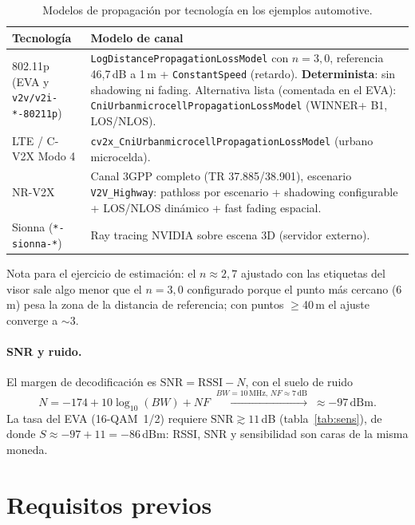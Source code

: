 \documentclass[11pt,a4paper]{article}
\begin{document}
\begin{table}[h!]
\centering\small
\begin{tabular}{@{}p{}p{}@{}}
\toprule
\textbf{Tecnología} & \textbf{Modelo de canal} \\
\midrule
802.11p (EVA y \texttt{v2v/v2i-*-80211p}) & \texttt{LogDistancePropagationLossModel} con $n=3{,}0$, referencia 46,7\,dB a 1\,m + \texttt{ConstantSpeed} (retardo). \textbf{Determinista}: sin shadowing ni fading. Alternativa lista (comentada en el EVA): \texttt{CniUrbanmicrocellPropagationLossModel} (WINNER+ B1, LOS/NLOS). \\
LTE / C-V2X Modo 4 & \texttt{cv2x\_CniUrbanmicrocellPropagationLossModel} (urbano microcelda). \\
NR-V2X & Canal 3GPP completo (TR 37.885/38.901), escenario \texttt{V2V\_Highway}: pathloss por escenario + shadowing configurable + LOS/NLOS dinámico + fast fading espacial. \\
Sionna (\texttt{*-sionna-*}) & Ray tracing NVIDIA sobre escena 3D (servidor externo). \\
\bottomrule
\end{tabular}
\caption{Modelos de propagación por tecnología en los ejemplos automotive.}
\label{tab:modelos}
\end{table}

Nota para el ejercicio de estimación: el $n\approx2{,}7$ ajustado con las
etiquetas del visor sale algo menor que el $n=3{,}0$ configurado porque el
punto más cercano (6\,m) pesa la zona de la distancia de referencia; con
puntos $\geq$40\,m el ajuste converge a $\sim$3.

\paragraph{SNR y ruido.} El margen de decodificación es
$\mathrm{SNR} = \mathrm{RSSI} - N$, con el suelo de ruido
\[ N = -174 + 10\log_{10}(BW) + NF
     \;\xrightarrow{BW=10\,\mathrm{MHz},\,NF\approx7\,\mathrm{dB}}\;
     \approx -97\,\mathrm{dBm}. \]
La tasa del EVA (16-QAM~1/2) requiere $\mathrm{SNR}\gtrsim 11$\,dB
(tabla~\ref{tab:sens}), de donde $S \approx -97+11 = -86$\,dBm: RSSI, SNR y
sensibilidad son caras de la misma moneda.

\section{Requisitos previos}
\end{document}
